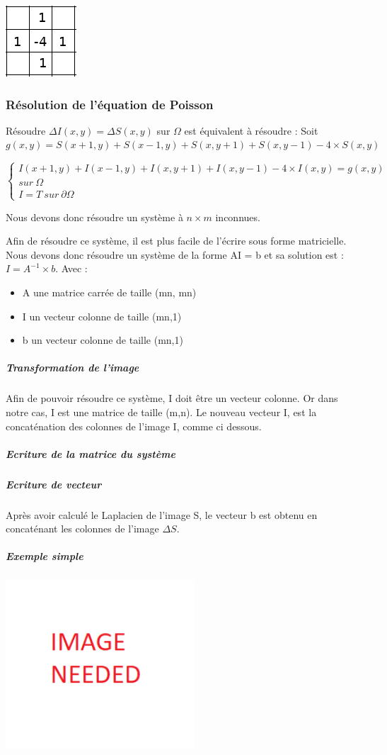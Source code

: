 \begin{center}
    \includegraphics[scale = 0.8]{Images/Laplacian.png}
\end{center}

\subsubsection{Résolution de l'équation de Poisson}
Résoudre $\Delta I(x,y) = \Delta S(x,y)$ sur $\Omega$ est équivalent à résoudre : 
Soit $g(x,y) = S(x+1,y) + S(x-1,y)+ S(x,y+1) + S(x,y-1) - 			4\times S(x,y)$
\begin{center}
\begin{equation*}
    \left \{
    \begin{aligned}
    I(x+1,y) + I(x-1,y)+ I(x,y+1) + I(x,y-1) - 4\times 			I(x,y)= g(x,y)\\ sur \ \Omega \\
    I = T \ sur \ \partial \Omega
    \end{aligned}
    \right.
\end{equation*}
\end{center}

Nous devons donc résoudre un système à $n\times m $ inconnues.

Afin de résoudre ce système, il est plus facile de l'écrire sous forme matricielle. Nous devons donc résoudre un système de la forme AI = b et sa solution est  :  $I = A^{-1}\times b$.
Avec : 
\begin{itemize}
\item A une matrice carrée de taille (mn, mn)
\item I un vecteur colonne de taille (mn,1)
\item b un vecteur colonne de taille (mn,1)
\end{itemize}

\subparagraph{Transformation de l'image}
Afin de pouvoir résoudre ce système, I doit être un vecteur colonne. Or dans notre cas, I est une matrice de taille (m,n). Le nouveau vecteur I, est la concaténation des colonnes de l'image I, comme ci dessous.


\subparagraph{Ecriture de la matrice du système}

\subparagraph{Ecriture de vecteur}
Après avoir calculé le Laplacien de l'image S, le vecteur b est obtenu en concaténant les colonnes de l'image $\Delta S$. 

\subparagraph{Exemple simple}

\begin{center}
    \includegraphics[width = 200pt]{Images/image_needed.png}
\end{center}
